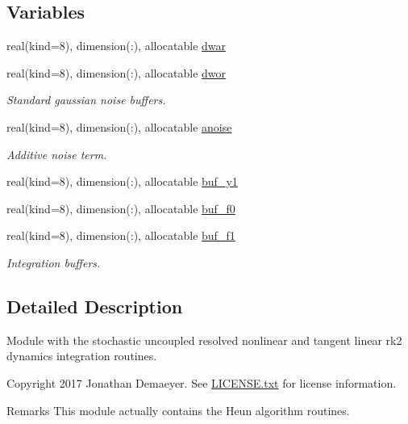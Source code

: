 \subsection*{Variables}
\begin{DoxyCompactItemize}
\item 
real(kind=8), dimension(\+:), allocatable \hyperlink{namespacerk2__ss__integrator_aa9dc56a3ff3887caced809dcb0257a1b}{dwar}
\item 
real(kind=8), dimension(\+:), allocatable \hyperlink{namespacerk2__ss__integrator_aeae3507fa2e319b59923f21622b58fc7}{dwor}
\begin{DoxyCompactList}\small\item\em Standard gaussian noise buffers. \end{DoxyCompactList}\item 
real(kind=8), dimension(\+:), allocatable \hyperlink{namespacerk2__ss__integrator_a26f660bf2b4b250a831c9fe4dc6c7726}{anoise}
\begin{DoxyCompactList}\small\item\em Additive noise term. \end{DoxyCompactList}\item 
real(kind=8), dimension(\+:), allocatable \hyperlink{namespacerk2__ss__integrator_a8b6b195712dd95f7eafe269379aa9dcc}{buf\+\_\+y1}
\item 
real(kind=8), dimension(\+:), allocatable \hyperlink{namespacerk2__ss__integrator_aebce0ce5ca95ff293f219a8f85d44851}{buf\+\_\+f0}
\item 
real(kind=8), dimension(\+:), allocatable \hyperlink{namespacerk2__ss__integrator_a1ffae309b7f72f07c598ab1882634ab3}{buf\+\_\+f1}
\begin{DoxyCompactList}\small\item\em Integration buffers. \end{DoxyCompactList}\end{DoxyCompactItemize}


\subsection{Detailed Description}
Module with the stochastic uncoupled resolved nonlinear and tangent linear rk2 dynamics integration routines. 

\begin{DoxyCopyright}{Copyright}
2017 Jonathan Demaeyer. See \hyperlink{LICENSE_8txt}{L\+I\+C\+E\+N\+S\+E.\+txt} for license information. 
\end{DoxyCopyright}
\begin{DoxyRemark}{Remarks}
This module actually contains the Heun algorithm routines. 
\end{DoxyRemark}


